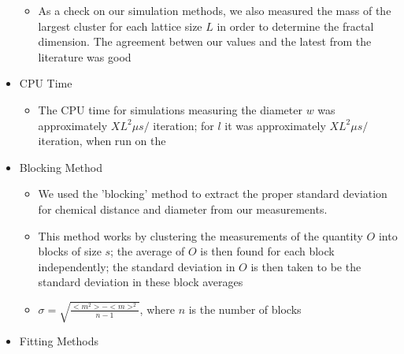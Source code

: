 \documentclass{umthesis}          %
\begin{document}
\begin{itemize}
\begin{itemize}
\item As a check on our simulation methods, we also measured the mass of the largest cluster for each lattice size $L$ in order to determine the fractal dimension.  The agreement betwen our values and the latest from the literature was good\\
\label{sec-4.2.5.6.1}

\end{itemize} %

\item CPU Time\\
\label{sec-4.2.5.7}

\begin{itemize}

\item The CPU time for simulations measuring the diameter $w$ was approximately $X L^2 \mu s /$ iteration; for $l$ it was approximately $X L^2 \mu s /$ iteration, when run on the\\
\label{sec-4.2.5.7.1}

\end{itemize} %

\item Blocking Method\\
\label{sec-4.3.1}

\begin{itemize}

\item We used the 'blocking' method \cite{NeBa99} to extract the proper standard deviation for chemical distance and diameter from our measurements.\\
\label{sec-4.3.1.1}


\item This method works by clustering the measurements of the quantity $O$ into blocks of size $s$; the average of $O$ is then found for each block independently;  the standard deviation in $O$ is then taken to be the standard deviation in these block averages\\
\label{sec-4.3.1.2}


\item $\sigma=\sqrt{ \frac{< m^2 > - < m >  ^2}{n-1}}$, where $n$ is the number of blocks\\
\label{sec-4.3.1.3}

\end{itemize} %

\item Fitting Methods\\
\label{sec-4.3.2}


\end{itemize}
\end{document}
